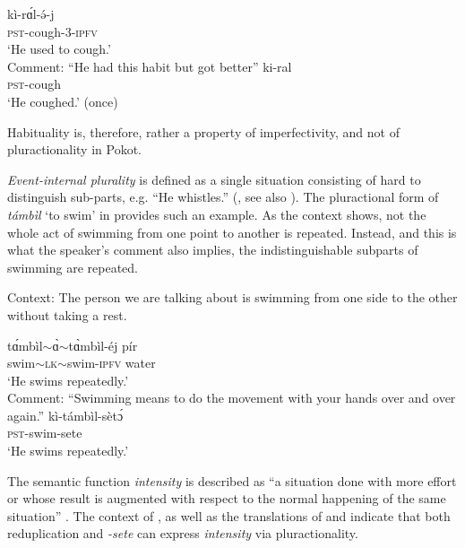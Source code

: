 \documentclass[output=paper,colorlinks,citecolor=brown
]{langscibook}
\begin{document}
\ea
\begin{xlist}
\ex 
\gll kì-rɑ́l-ə́-j\\
\textsc{pst}-cough-\textsc{3-ipfv}\\
\glt `He used to cough.'\\
Comment: ``He had this habit but got better''
\ex
\gll ki-ral\\
\textsc{pst}-cough\\
\glt `He coughed.' (once)
\end{xlist}
\z

\noindent Habituality is, therefore, rather a property of imperfectivity, and not of pluractionality in Pokot.


\textit{Event-internal plurality} is defined as a single situation consisting of hard to distinguish sub-parts, e.g. ``He whistles.'' (\citealt{Mattiola2019}, see also \citealt{Cusic81}). The pluractional form of \textit{támbìl} `to swim' in  provides such an example. As the context shows, not the whole act of swimming from one point to another is repeated. Instead, and this is what the speaker's comment also implies, the indistinguishable subparts of swimming are repeated. 



\ea Context: The person we are talking about is swimming from one side to the other without taking a rest.\label{ex:fiebig:swim}
\begin{xlist}

\ex
\gll tɑ́mbìl$\sim$ɑ̀$\sim$tɑ̀mbìl-éj pír\\
swim$\sim$\textsc{lk}$\sim$swim-\textsc{ipfv} water\\
\glt `He swims repeatedly.'\\
Comment: ``Swimming means to do the movement with your hands over and over again.''
\ex
\gll  kì-támbìl-sètɔ́\\
\textsc{pst}-swim-sete\\
\glt `He swims repeatedly.'

\end{xlist}
\z



The semantic function \textit{intensity} is described as ``a situation done with more effort or whose result is augmented with respect to the normal happening of the same situation'' \citep[36]{Mattiola2019}. The context of , as well as the translations of  and  indicate that both reduplication and \textit{-sete} can express \textit{intensity} via pluractionality.
\end{document}
